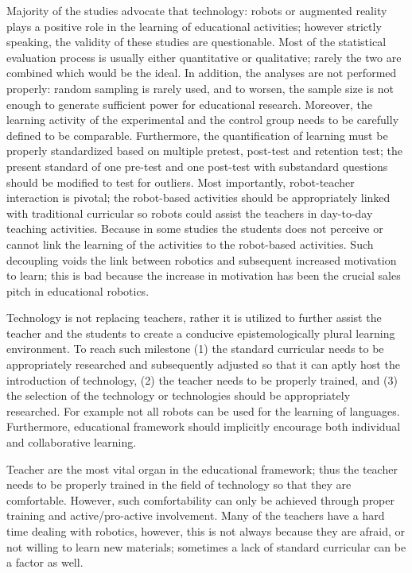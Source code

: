 \documentclass[conference]{IEEEtran}
\begin{document}
Majority of the studies advocate that technology: robots or augmented reality plays a positive role in the learning 
of educational activities; however strictly speaking, the validity of these studies are questionable. Most of the 
statistical evaluation process is usually either quantitative or qualitative; rarely the two are combined which would 
be the ideal. In addition, the analyses are not performed properly: random sampling is rarely used, and to worsen, the 
sample size is not enough to generate sufficient power for educational research. Moreover, the learning activity of the 
experimental and the control group needs to be carefully defined to be comparable. Furthermore, the quantification of 
learning must be properly standardized based on multiple pretest, post-test and retention test; the present standard of 
one pre-test and one post-test with substandard questions should be modified to test for outliers. Most importantly, 
robot-teacher interaction is pivotal; the robot-based activities should be appropriately linked with traditional 
curricular so robots could assist the teachers in day-to-day teaching activities. Because in some studies the students 
does not perceive or cannot link the learning of the activities to the robot-based activities. Such decoupling voids the 
link between robotics and subsequent increased motivation to learn; this is bad because the increase in motivation has 
been the crucial sales pitch in educational robotics.

Technology is not replacing teachers, rather it is utilized to further assist the teacher and the students to create a 
conducive epistemologically plural learning environment. To reach such milestone (1) the standard curricular needs to 
be appropriately researched and subsequently adjusted so that it can aptly host the introduction of technology, (2) the 
teacher needs to be properly trained, and (3) the selection of the technology or technologies should be appropriately 
researched. For example not all robots can be used for the learning of languages. Furthermore, educational framework 
should implicitly encourage both individual and collaborative learning. 

Teacher are the most vital organ in the educational framework; thus the teacher needs to be properly trained in the 
field of technology so that they are comfortable. However, such comfortability can only be achieved 
through proper training and active/pro-active involvement. Many of the teachers have a hard time dealing with robotics, 
however, this is not always because they are afraid, or not willing to learn new materials; sometimes a lack of standard 
curricular can be a factor as well. 
\end{document}

